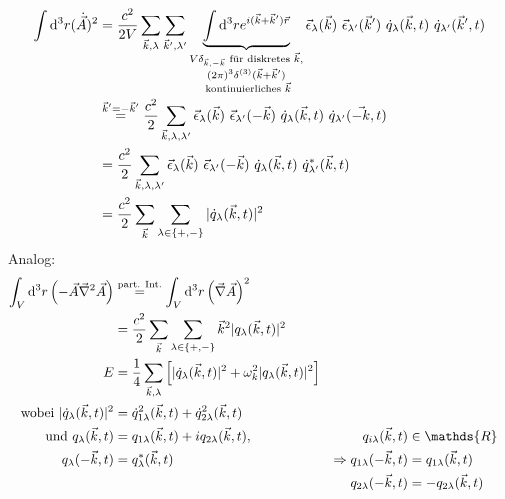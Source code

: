 		\begin{align*}
			\int \mathrm{d}^3 r (\dot{\vec{A}})^2 &= 
			\frac{c^2}{2 V} \sum_{\vec{k}, \lambda} \sum_{\vec{k}', \lambda'}
			\underbrace{\int \mathrm{d}^3 r e^{i (\vec{k} + \vec{k}') \vec{r}}}_{
				\substack{V \delta_{\vec{k}, -\vec{k}} 
					\text{~für diskretes~} \vec{k},\\ 
					(2 \pi)^3 \delta^{(3)} (\vec{k} + \vec{k}') \\ 
					\text{~kontinuierliches~} \vec{k}}
				}
			\vec{\epsilon}_\lambda(\vec{k}) ~\vec{\epsilon}_{\lambda'} (\vec{k}')
			~\dot{q}_\lambda (\vec{k} , t) ~\dot{q}_{\lambda'} (\vec{k}' , t) 
			\\
			&\overset{\vec{k}' = -\vec{k}'}{=} 
			\frac{c^2}{2} \sum_{\vec{k}, \lambda, \lambda'}
			\vec{\epsilon}_\lambda (\vec{k}) ~\vec{\epsilon}_{\lambda'}(-\vec{k})~
			\dot{q}_\lambda (\vec{k} , t) ~\dot{q}_{\lambda'} (\vec{-k} , t)
			\\
			&= \frac{c^2}{2} \sum_{\vec{k}, \lambda, \lambda'}
			\vec{\epsilon}_\lambda (\vec{k}) ~\vec{\epsilon}_{\lambda'}(-\vec{k})~
			\dot{q}_\lambda (\vec{k} , t) ~\dot{q}^*_{\lambda'} (\vec{k} , t)
			\\
			&= \frac{c^2}{2} \sum_{\vec{k}} \sum_{\lambda \in \{+ , - \} }
			| \dot{q}_\lambda(\vec{k} , t)  |^2
		\end{align*}
	Analog:
		\begin{align*}
			\int_V \diff^3 r \left(- \vec{A} \vec{\nabla}^2 \vec{A}\right)
			&\overset{\text{part. Int.}}{=} \int_V \diff^3 r \left( \vec{\nabla} \vec{A} \right)^2 \\
			&= \frac{c^2}{2} \sum_{\vec{k}} \sum_{\lambda \in \{+ , - \} }
			\vec{k}^2 |q_\lambda (\vec{k} , t)|^2 \\
			E &= \frac{1}{4} \sum_{\vec{k} , \lambda} \left[
				|\dot{q}_\lambda (\vec{k} , t)|^2 + \omega^2_k |q_\lambda (\vec{k} , t)|^2
			\right] \\
			\text{wobei~} |\dot{q}_\lambda (\vec{k} , t)|^2 &= 
			\dot{q}_{1 \lambda}^2 (\vec{k} , t) + \dot{q}_{2 \lambda}^2 (\vec{k} , t) 
			\\
			\text{und~} 
			q_\lambda (\vec{k} , t) &= q_{1 \lambda} (\vec{k} , t) + i q_{2 \lambda} (\vec{k} , t) 
			,& q_{i \lambda} (\vec{k} , t) &\in \mathds{R} 
			\\
			q_\lambda (-\vec{k} , t) &= q_\lambda^* (\vec{k} , t) 
			&\Rightarrow q_{1 \lambda} (-\vec{k} , t) &= q_{1 \lambda} (\vec{k} , t) 
			\\
			& & q_{2 \lambda} (-\vec{k} , t) &= - q_{2 \lambda} (\vec{k} , t)			
		\end{align*}

